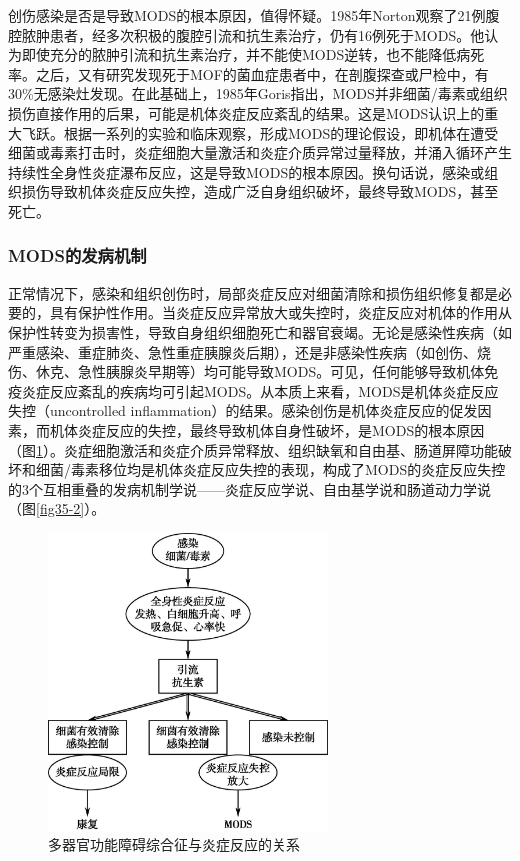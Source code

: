 创伤感染是否是导致MODS的根本原因，值得怀疑。1985年Norton观察了21例腹腔脓肿患者，经多次积极的腹腔引流和抗生素治疗，仍有16例死于MODS。他认为即使充分的脓肿引流和抗生素治疗，并不能使MODS逆转，也不能降低病死率。之后，又有研究发现死于MOF的菌血症患者中，在剖腹探查或尸检中，有30\%无感染灶发现。在此基础上，1985年Goris指出，MODS并非细菌/毒素或组织损伤直接作用的后果，可能是机体炎症反应紊乱的结果。这是MODS认识上的重大飞跃。根据一系列的实验和临床观察，形成MODS的理论假设，即机体在遭受细菌或毒素打击时，炎症细胞大量激活和炎症介质异常过量释放，并涌入循环产生持续性全身性炎症瀑布反应，这是导致MODS的根本原因。换句话说，感染或组织损伤导致机体炎症反应失控，造成广泛自身组织破坏，最终导致MODS，甚至死亡。

\subsubsection{MODS的发病机制}

正常情况下，感染和组织创伤时，局部炎症反应对细菌清除和损伤组织修复都是必要的，具有保护性作用。当炎症反应异常放大或失控时，炎症反应对机体的作用从保护性转变为损害性，导致自身组织细胞死亡和器官衰竭。无论是感染性疾病（如严重感染、重症肺炎、急性重症胰腺炎后期），还是非感染性疾病（如创伤、烧伤、休克、急性胰腺炎早期等）均可能导致MODS。可见，任何能够导致机体免疫炎症反应紊乱的疾病均可引起MODS。从本质上来看，MODS是机体炎症反应失控（uncontrolled
inflammation）的结果。感染创伤是机体炎症反应的促发因素，而机体炎症反应的失控，最终导致机体自身性破坏，是MODS的根本原因（图\ref{fig35-1}）。炎症细胞激活和炎症介质异常释放、组织缺氧和自由基、肠道屏障功能破坏和细菌/毒素移位均是机体炎症反应失控的表现，构成了MODS的炎症反应失控的3个互相重叠的发病机制学说------炎症反应学说、自由基学说和肠道动力学说（图\ref{fig35-2}）。

\begin{figure}[!htbp]
 \centering
 \includegraphics[width=2.91667in,height=3.10417in]{./images/Image00132.jpg}
 \captionsetup{justification=centering}
 \caption{多器官功能障碍综合征与炎症反应的关系}
 \label{fig35-1}
  \end{figure} 

